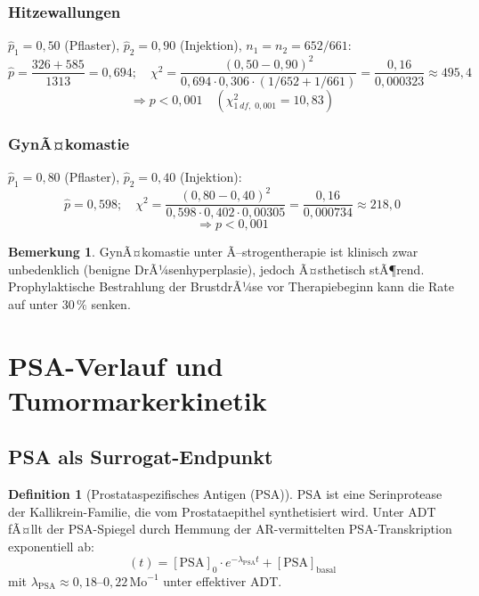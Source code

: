 ﻿\documentclass[a4paper,12pt]{article}
\theoremstyle{definition}
\newtheorem{definition}{Definition}
\newtheorem{bemerkung}{Bemerkung}
\begin{document}
\subsubsection{Hitzewallungen}

$\hat{p}_{1} = 0{,}50$ (Pflaster), $\hat{p}_{2} = 0{,}90$ (Injektion), $n_1 = n_2 = 652/661$:
\[
  \hat{p} = \frac{326 + 585}{1313} = 0{,}694; \quad
  \chi^2 = \frac{(0{,}50 - 0{,}90)^2}{0{,}694 \cdot 0{,}306 \cdot (1/652 + 1/661)}
  = \frac{0{,}16}{0{,}000323} \approx 495{,}4
\]
\[
  \Rightarrow p < 0{,}001 \quad (\chi^2_{1\,df,\;0{,}001} = 10{,}83)
\]

\subsubsection{GynÃ¤komastie}

$\hat{p}_{1} = 0{,}80$ (Pflaster), $\hat{p}_{2} = 0{,}40$ (Injektion):
\[
  \hat{p} = 0{,}598; \quad
  \chi^2 = \frac{(0{,}80 - 0{,}40)^2}{0{,}598 \cdot 0{,}402 \cdot 0{,}00305}
  = \frac{0{,}16}{0{,}000734} \approx 218{,}0
\]
\[
  \Rightarrow p < 0{,}001
\]

\begin{bemerkung}
GynÃ¤komastie unter Ã–strogentherapie ist klinisch zwar unbedenklich (benigne DrÃ¼senhyperplasie), jedoch Ã¤sthetisch stÃ¶rend.
Prophylaktische Bestrahlung der BrustdrÃ¼se vor Therapiebeginn kann die Rate auf unter $30\,\%$ senken.
\end{bemerkung}

\section{PSA-Verlauf und Tumormarkerkinetik}

\subsection{PSA als Surrogat-Endpunkt}

\begin{definition}[Prostataspezifisches Antigen (PSA)]
PSA ist eine Serinprotease der Kallikrein-Familie, die vom Prostataepithel synthetisiert wird.
Unter ADT fÃ¤llt der PSA-Spiegel durch Hemmung der AR-vermittelten PSA-Transkription exponentiell ab:
\begin{equation}
  [\mathrm{PSA}](t) = [\mathrm{PSA}]_0 \cdot e^{-\lambda_{\mathrm{PSA}} t} + [\mathrm{PSA}]_{\mathrm{basal}}
\end{equation}
mit $\lambda_{\mathrm{PSA}} \approx 0{,}18$--$0{,}22\,\text{Mo}^{-1}$ unter effektiver ADT.
\end{definition}
\end{document}
